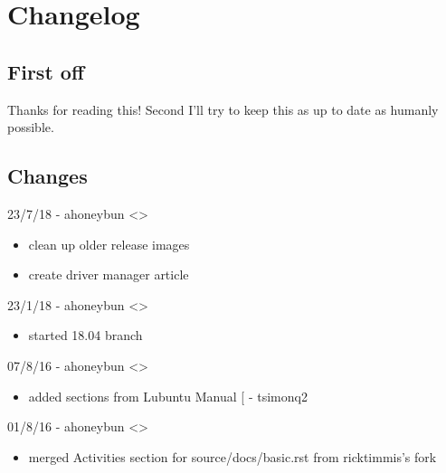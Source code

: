 \documentclass[letterpaper,10pt,english]{sphinxmanual}
\begin{document}
\section{Changelog}
\label{\detokenize{docs/appendix/changes:changelog}}\label{\detokenize{docs/appendix/changes::doc}}

\subsection{First off}
\label{\detokenize{docs/appendix/changes:first-off}}
Thanks for reading this! Second I’ll try to keep this as up to date as humanly possible.


\subsection{Changes}
\label{\detokenize{docs/appendix/changes:changes}}
23/7/18 - ahoneybun \textless{}\textgreater{}
\begin{itemize}
\item {} 
clean up older release images

\item {} 
create driver manager article

\end{itemize}

23/1/18 - ahoneybun \textless{}\textgreater{}
\begin{itemize}
\item {} 
started 18.04 branch

\end{itemize}

07/8/16 - ahoneybun \textless{}\textgreater{}
\begin{itemize}
\item {} 
added sections from Lubuntu Manual {[}\sphinxurl{https://github.com/tsimonq2/lubuntu-manual}{]}
- tsimonq2

\end{itemize}

01/8/16 - ahoneybun \textless{}\textgreater{}
\begin{itemize}
\item {} 
merged Activities section for source/docs/basic.rst from ricktimmis’s fork

\end{itemize}
\end{document}
